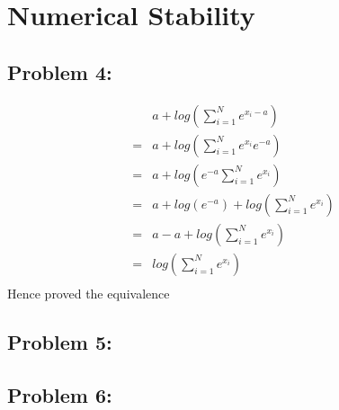 \documentclass[5pt,a4paper]{article}
\begin{document}
	\section{ Numerical Stability}
	\subsection*{Problem 4:}
	\begin{eqnarray*}
	&a+log(\sum_{i=1}^{N}e^{x_i-a})\\
	=&a+log(\sum_{i=1}^{N}e^{x_i}e^{-a})\\
	=&a+log(e^{-a}\sum_{i=1}^{N}e^{x_i})\\
	=&a+log(e^{-a})+log(\sum_{i=1}^{N}e^{x_i})\\
	=&a-a+log(\sum_{i=1}^{N}e^{x_i})\\
	=&log(\sum_{i=1}^{N}e^{x_i})\\
	\end{eqnarray*}
	Hence proved the equivalence
	
	\subsection*{Problem 5:}
	\subsection*{Problem 6:}
	
	
\end{document}

